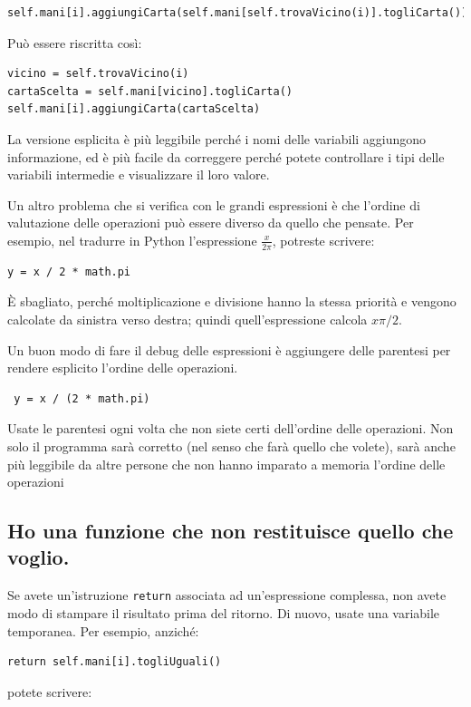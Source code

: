 \documentclass[10pt]{book}
\begin{document}
\begin{verbatim}
self.mani[i].aggiungiCarta(self.mani[self.trovaVicino(i)].togliCarta())
\end{verbatim}
%
Può essere riscritta così:

\begin{verbatim}
vicino = self.trovaVicino(i)
cartaScelta = self.mani[vicino].togliCarta()
self.mani[i].aggiungiCarta(cartaScelta)
\end{verbatim}
%
La versione esplicita è più leggibile perché i nomi delle variabili aggiungono informazione, ed è più facile da correggere perché potete controllare i tipi delle variabili intermedie e visualizzare il loro valore.

Un altro problema che si verifica con le grandi espressioni è che l'ordine di valutazione delle operazioni può essere diverso da quello che pensate.
Per esempio, nel tradurre in Python l'espressione
$\frac{x}{2 \pi}$, potreste scrivere:

\begin{verbatim}
y = x / 2 * math.pi
\end{verbatim}
%
È sbagliato, perché moltiplicazione e divisione hanno la stessa priorità e vengono calcolate da sinistra verso destra; quindi quell'espressione calcola $x \pi / 2$.

Un buon modo di fare il debug delle espressioni è aggiungere delle parentesi per rendere esplicito l'ordine delle operazioni.

\begin{verbatim}
 y = x / (2 * math.pi)
\end{verbatim}
%
Usate le parentesi ogni volta che non siete certi dell'ordine delle operazioni. Non solo il programma sarà corretto (nel senso che farà quello che volete), sarà anche più leggibile da altre persone che non hanno imparato a memoria l'ordine delle operazioni


\subsection{Ho una funzione che non restituisce quello che voglio.}

Se avete un'istruzione {\tt return} associata ad un'espressione complessa, non avete modo di stampare il risultato prima del ritorno. Di nuovo, usate una variabile temporanea. Per esempio, anziché:

\begin{verbatim}
return self.mani[i].togliUguali()
\end{verbatim}
%
potete scrivere:
\end{document}
